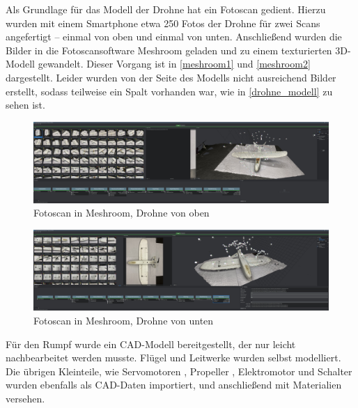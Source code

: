 Als Grundlage für das Modell der Drohne hat ein Fotoscan gedient. Hierzu wurden mit einem Smartphone etwa 250 Fotos der Drohne für zwei Scans angefertigt -- einmal von oben und einmal von unten. Anschließend wurden die Bilder in die Fotoscansoftware Meshroom geladen und zu einem texturierten 3D-Modell gewandelt. Dieser Vorgang ist in \autoref{meshroom1} und \autoref{meshroom2} dargestellt. Leider wurden von der Seite des Modells nicht ausreichend Bilder erstellt, sodass teilweise ein Spalt vorhanden war, wie in \autoref{drohne_modell} zu sehen ist.\\
\begin{figure}[H]
\begin{center}
\includegraphics[width=\textwidth]{gfx/prod/plane/meshroom1.jpg}
\caption{Fotoscan in Meshroom, Drohne von oben}
\label{meshroom1}
\end{center}
\end{figure}

\begin{figure}[H]
\begin{center}
\includegraphics[width=\textwidth]{gfx/prod/plane/meshroom2.jpg}
\caption{Fotoscan in Meshroom, Drohne von unten}
\label{meshroom2}
\end{center}
\end{figure}

Für den Rumpf wurde ein CAD-Modell bereitgestellt, der nur leicht nachbearbeitet werden musste. Flügel und Leitwerke wurden selbst modelliert.\\
Die übrigen Kleinteile, wie Servomotoren , Propeller , Elektromotor  und Schalter  wurden ebenfalls als CAD-Daten importiert, und anschließend mit Materialien versehen.

